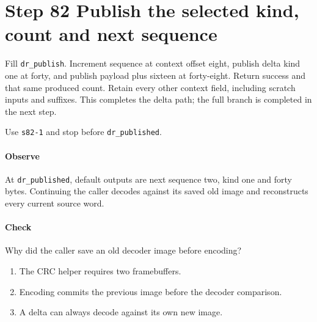 \section{Step 82 Publish the selected kind, count and next sequence}
Fill \texttt{dr\_publish}. Increment sequence at context offset eight, publish delta kind one at forty, and publish payload plus sixteen at forty-eight. Return success and that same produced count. Retain every other context field, including scratch inputs and suffixes. This completes the delta path; the full branch is completed in the next step.

Use \texttt{s82-1} and stop before \texttt{dr\_published}.

\paragraph{Observe} At \texttt{dr\_published}, default outputs are next sequence two, kind one and forty bytes. Continuing the caller decodes against its saved old image and reconstructs every current source word.

\paragraph{Check} Why did the caller save an old decoder image before encoding?
\begin{enumerate}[label=\Alph*.]
  \item The CRC helper requires two framebuffers.
  \item Encoding commits the previous image before the decoder comparison.
  \item A delta can always decode against its own new image.
\end{enumerate}
